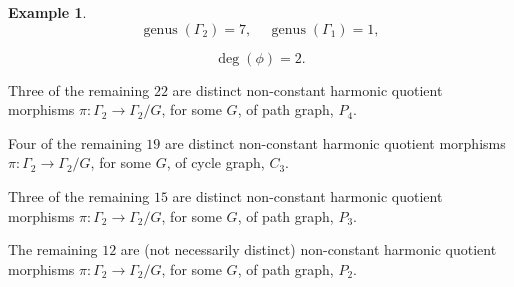 \documentclass[12pt,letterpaper]{article}
\theoremstyle{definition}
\newtheorem{example}[theorem]{Example}
\DeclareMathOperator{\genus}{genus}
\begin{document}
\begin{example}
{\[
  \genus(\Gamma_2) =7,\ \ \ \ \
  \genus(\Gamma_1) =1,
\]

\[
\deg(\phi) =2.
\]

Three of the remaining $22$ are distinct non-constant harmonic quotient
morphisms $\pi: \Gamma_2\to \Gamma_2/G$, for some $G$, of
path graph, $P_4$.

Four of the remaining $19$ are distinct non-constant harmonic quotient
morphisms $\pi: \Gamma_2\to \Gamma_2/G$, for some $G$, of
cycle graph, $C_3$.

Three of the remaining $15$ are distinct non-constant harmonic quotient
morphisms $\pi: \Gamma_2\to \Gamma_2/G$, for some $G$, of
path graph, $P_3$.

The remaining $12$ are (not necessarily distinct) non-constant harmonic quotient
morphisms $\pi: \Gamma_2\to \Gamma_2/G$, for some $G$, of
path graph, $P_2$.


}
\end{example}
\end{document}
